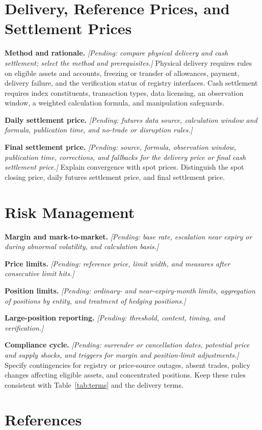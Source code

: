\documentclass[10pt,a4paper,twocolumn]{article}
\newcommand{\pending}[1]{\textcolor{draftgray}{\textit{[Pending: #1]}}}
\begin{document}
\section{Delivery, Reference Prices, and Settlement Prices}
\noindent\textbf{Method and rationale.} \pending{compare physical delivery and cash settlement; select the method and prerequisites.} Physical delivery requires rules on eligible assets and accounts, freezing or transfer of allowances, payment, delivery failure, and the verification status of registry interfaces. Cash settlement requires index constituents, transaction types, data licensing, an observation window, a weighted calculation formula, and manipulation safeguards.

\noindent\textbf{Daily settlement price.} \pending{futures data source, calculation window and formula, publication time, and no-trade or disruption rules.}

\noindent\textbf{Final settlement price.} \pending{source, formula, observation window, publication time, corrections, and fallbacks for the delivery price or final cash settlement price.} Explain convergence with spot prices. Distinguish the spot closing price, daily futures settlement price, and final settlement price.

\newpage
\section{Risk Management}
\noindent\textbf{Margin and mark-to-market.} \pending{base rate, escalation near expiry or during abnormal volatility, and calculation basis.}

\noindent\textbf{Price limits.} \pending{reference price, limit width, and measures after consecutive limit hits.}

\noindent\textbf{Position limits.} \pending{ordinary- and near-expiry-month limits, aggregation of positions by entity, and treatment of hedging positions.}

\noindent\textbf{Large-position reporting.} \pending{threshold, content, timing, and verification.}

\noindent\textbf{Compliance cycle.} \pending{surrender or cancellation dates, potential price and supply shocks, and triggers for margin and position-limit adjustments.} Specify contingencies for registry or price-source outages, absent trades, policy changes affecting eligible assets, and concentrated positions. Keep these rules consistent with Table~\ref{tab:terms} and the delivery terms.

\clearpage
\section*{References}
\begingroup
\footnotesize
\setlength{\bibhang}{1.5em}
\setlength{\bibitemsep}{0.4\baselineskip}
\printbibliography[heading=none]
\endgroup
\end{document}
